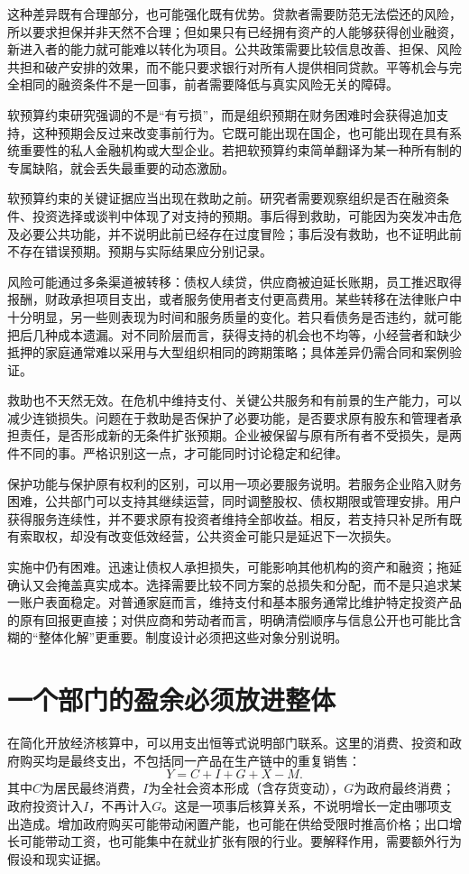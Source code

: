 \documentclass[UTF8,fontset=fandol,zihao=-4,oneside,openany]{ctexbook}
\begin{document}
这种差异既有合理部分，也可能强化既有优势。贷款者需要防范无法偿还的风险，所以要求担保并非天然不合理；但如果只有已经拥有资产的人能够获得创业融资，新进入者的能力就可能难以转化为项目。公共政策需要比较信息改善、担保、风险共担和破产安排的效果，而不能只要求银行对所有人提供相同贷款。平等机会与完全相同的融资条件不是一回事，前者需要降低与真实风险无关的障碍。

软预算约束研究强调的不是“有亏损”，而是组织预期在财务困难时会获得追加支持，这种预期会反过来改变事前行为。它既可能出现在国企，也可能出现在具有系统重要性的私人金融机构或大型企业。若把软预算约束简单翻译为某一种所有制的专属缺陷，就会丢失最重要的动态激励。\cite{Kornai2003}

\label{arg:P029}
软预算约束的关键证据应当出现在救助之前。研究者需要观察组织是否在融资条件、投资选择或谈判中体现了对支持的预期。事后得到救助，可能因为突发冲击危及必要公共功能，并不说明此前已经存在过度冒险；事后没有救助，也不证明此前不存在错误预期。预期与实际结果应分别记录。

风险可能通过多条渠道被转移：债权人续贷，供应商被迫延长账期，员工推迟取得报酬，财政承担项目支出，或者服务使用者支付更高费用。某些转移在法律账户中十分明显，另一些则表现为时间和服务质量的变化。若只看债务是否违约，就可能把后几种成本遗漏。对不同阶层而言，获得支持的机会也不均等，小经营者和缺少抵押的家庭通常难以采用与大型组织相同的跨期策略；具体差异仍需合同和案例验证。

救助也不天然无效。在危机中维持支付、关键公共服务和有前景的生产能力，可以减少连锁损失。问题在于救助是否保护了必要功能，是否要求原有股东和管理者承担责任，是否形成新的无条件扩张预期。企业被保留与原有所有者不受损失，是两件不同的事。严格识别这一点，才可能同时讨论稳定和纪律。

\label{arg:P030}
保护功能与保护原有权利的区别，可以用一项必要服务说明。若服务企业陷入财务困难，公共部门可以支持其继续运营，同时调整股权、债权期限或管理安排。用户获得服务连续性，并不要求原有投资者维持全部收益。相反，若支持只补足所有既有索取权，却没有改变低效经营，公共资金可能只是延迟下一次损失。

实施中仍有困难。迅速让债权人承担损失，可能影响其他机构的资产和融资；拖延确认又会掩盖真实成本。选择需要比较不同方案的总损失和分配，而不是只追求某一账户表面稳定。对普通家庭而言，维持支付和基本服务通常比维护特定投资产品的原有回报更直接；对供应商和劳动者而言，明确清偿顺序与信息公开也可能比含糊的“整体化解”更重要。制度设计必须把这些对象分别说明。

\section{一个部门的盈余必须放进整体}
在简化开放经济核算中，可以用支出恒等式说明部门联系。这里的消费、投资和政府购买均是最终支出，不包括同一产品在生产链中的重复销售：
\[
Y=C+I+G+X-M.
\]
其中$C$为居民最终消费，$I$为全社会资本形成（含存货变动），$G$为政府最终消费；政府投资计入$I$，不再计入$G$。这是一项事后核算关系，不说明增长一定由哪项支出造成。增加政府购买可能带动闲置产能，也可能在供给受限时推高价格；出口增长可能带动工资，也可能集中在就业扩张有限的行业。要解释作用，需要额外行为假设和现实证据。
\end{document}
